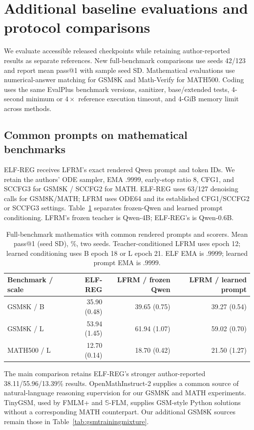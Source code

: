 \documentclass{article}
\newenvironment{revision}{\begingroup\color{blue}}{\endgroup}
\begin{document}
\clearpage
\begin{revision}
\section{Additional baseline evaluations and protocol comparisons}
\label{app:baselinefollowups}
We evaluate accessible released checkpoints while retaining author-reported results as separate references. New full-benchmark comparisons use seeds 42/123 and report mean pass@1 with sample seed SD. Mathematical evaluations use numerical-answer matching for GSM8K and Math-Verify for MATH500. Coding uses the same EvalPlus benchmark versions, sanitizer, base/extended tests, 4-second minimum or $4\times$ reference execution timeout, and 4-GiB memory limit across methods.

\subsection{Common prompts on mathematical benchmarks}
ELF-REG receives LFRM's exact rendered Qwen prompt and token IDs. We retain the authors' ODE sampler, EMA $.9999$, early-stop ratio 8, CFG1, and SCCFG3 for GSM8K / SCCFG2 for MATH. ELF-REG uses 63/127 denoising calls for GSM8K/MATH; LFRM uses ODE64 and its established CFG1/SCCFG2 or SCCFG3 settings. Table~\ref{tab:matchedmathbaselines} separates frozen-Qwen and learned prompt conditioning. LFRM's frozen teacher is Qwen-4B; ELF-REG's is Qwen-0.6B.
\begin{table}[htbp]\color{blue}\centering\small
\caption{Full-benchmark mathematics with common rendered prompts and scorers. Mean pass@1 (seed SD), \%, two seeds. Teacher-conditioned LFRM uses epoch 12; learned conditioning uses B epoch 18 or L epoch 21. ELF EMA is $.9999$; learned prompt EMA is $.9999$.}
\label{tab:matchedmathbaselines}
\begin{tabular}{@{}lrrr@{}}\toprule
Benchmark / scale & ELF-REG & LFRM / frozen Qwen & LFRM / learned prompt\\\midrule
GSM8K / B & 35.90 (0.48) & 39.65 (0.75) & 39.27 (0.54)\\
GSM8K / L & 53.94 (1.45) & 61.94 (1.07) & 59.02 (0.70)\\
MATH500 / L & 12.70 (0.14) & 18.70 (0.42) & 21.50 (1.27)\\\bottomrule
\end{tabular}
\end{table}
The main comparison retains ELF-REG's stronger author-reported 38.11/55.96/13.39\% results. OpenMathInstruct-2 supplies a common source of natural-language reasoning supervision for our GSM8K and MATH experiments. TinyGSM, used by FMLM+ and $\mathbb S$-FLM, supplies GSM-style Python solutions without a corresponding MATH counterpart. Our additional GSM8K sources remain those in Table~\ref{tab:gsmtrainingmixture}.


\end{revision}
\end{document}
